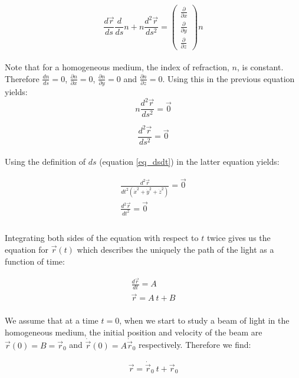 \documentclass{article}
\def\Nabla{
	\begin{pmatrix}
		\frac{\partial}{\partial {x}} \\
		\frac{\partial}{\partial {y}} \\
		\frac{\partial}{\partial {z}}
	\end{pmatrix}}
\begin{document}
\begin{equation*}
	\frac{d \vec{r}}{ds} \frac{d}{ds} n + n \frac{d^2 \vec{r}}{ds^2} = \Nabla n
\end{equation*} \\

Note that for a homogeneous medium, the index of refraction, $n$, is constant. Therefore $\frac{dn}{ds} = 0$, $\frac{\partial n}{\partial x} = 0$, $\frac{\partial n}{\partial y} = 0$ and $\frac{\partial n}{\partial z} = 0$. Using this in the previous equation yields: \\

\begin{equation*}
	 n \frac{d^2 \vec{r}}{ds^2} = \vec{0}
\end{equation*}

\begin{equation*}
	 \frac{d^2 \vec{r}}{ds^2} = \vec{0}
\end{equation*} \\

Using the definition of $ds$ (equation \ref{eq_dsdt}) in the latter equation yields:

\begin{align*}
	 \frac{d^2 \vec{r}}{dt^2 (\dot{x}^2+\dot{y}^2+\dot{z}^2)} = \vec{0} \\
	 \frac{d^2 \vec{r}}{dt^2} = \vec{0} \\
\end{align*} \\

Integrating both sides of the equation with respect to $t$ twice gives us the equation for $\vec{r}(t)$ which describes the uniquely the path of the light as a function of time:

\begin{align*}
	 \frac{d \vec{r}}{dt} = A \\
	 \vec{r} = A \: t + B
\end{align*} \\

We assume that at a time $t=0$, when we start to study a beam of light in the homogeneous medium, the initial position and velocity of the beam are $\vec{r}(0) = B = \vec{r}_0$ and  $ \dot{\vec{r}}(0) = A  \dot{\vec{r}}_0$ respectively. Therefore we find:

\begin{align*}
	 \vec{r} = \dot{\vec{r}}_0 \: t + \vec{r}_0
\end{align*} \\
\end{document}
